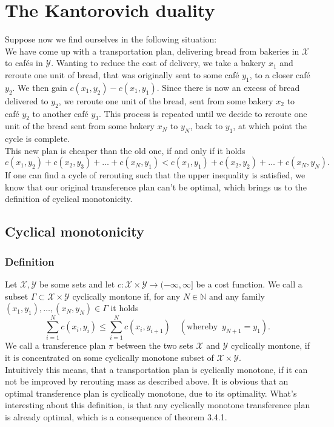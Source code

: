 \documentclass[11pt,a4paper]{article}
\begin{document}
\section{The Kantorovich duality}
Suppose now we find ourselves in the following situation:\\
We have come up with a transportation plan, delivering bread from bakeries in $\mathcal{X}$ to cafés in $\mathcal{Y}$. Wanting to reduce the cost of delivery, we take a bakery $x_1$ and reroute one unit of bread, that was originally sent to some café $y_1$, to a closer café $y_2$. We then gain $c(x_1,y_2)-c(x_1,y_1)$. Since there is now an excess of bread delivered to $y_2$, we reroute one unit of the bread, sent from some bakery $x_2$ to café $y_2$ to another café $y_3$. This process is repeated until we decide to reroute one unit of the bread sent from some bakery $x_N$ to $y_N$, back to $y_1$, at which point the cycle is complete.\\This new plan is cheaper than the old one, if and only if it holds
\[
c(x_1,y_2)+c(x_2,y_3)+\ldots+c(x_N,y_1) < c(x_1,y_1)+c(x_2,y_2)+\ldots+c(x_N,y_N).
\] 
If one can find a cycle of rerouting such that the upper inequality is satisfied, we know that our original transference plan can't be optimal, which brings us to the definition of cyclical monotonicity.
\subsection{Cyclical monotonicity}
\subsubsection{Definition}
Let $\mathcal{X,Y}$ be some sets and let $c:\mathcal{X\times{}Y}\rightarrow(-\infty,\infty]$ be a cost function. We call a subset $\Gamma\subset\mathcal{X\times{}Y}$ cyclically montone if, for any $N\in\mathbb{N}$ and any family $(x_1,y_1),\ldots,(x_N,y_N)\in\Gamma$ it holds
\[
\sum\limits_{i=1}^{N}c(x_i,y_i) \leq \sum\limits_{i=1}^{N}c(x_i,y_{i+1})\quad(\text{whereby }\, y_{N+1}=y_1).
\]
We call a transference plan $\pi$ between the two sets $\mathcal{X}$ and $\mathcal{Y}$ cyclically montone, if it is concentrated on some cyclically monotone subset of $\mathcal{X\times{}Y}$.\vspace{1em}\\
Intuitively this means, that a transportation plan is cyclically monotone, if it can not be improved by rerouting mass as described above.
It is obvious that an optimal transference plan is cyclically monotone, due to its optimality. What's interesting about this definition, is that any cyclically monotone transference plan is already optimal, which is a consequence of theorem 3.4.1.
\end{document}
